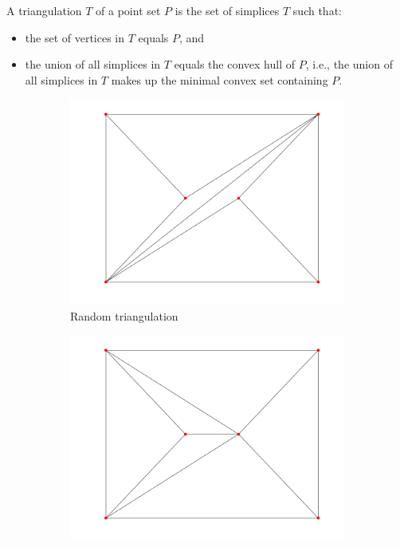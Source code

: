 \begin{definition}[Triangulation]
A triangulation $T$ of a point set $P$ is the set of simplices $T$ such that:
\begin{itemize}
    \item the set of vertices in $T$ equals $P$, and
    \item the union of all simplices in $T$ equals the convex hull of $P$, i.e., the union of all simplices in $T$ makes up the minimal convex set containing $P$.
\end{itemize}
\end{definition}
\begin{figure}[ht]
    \centering
    \begin{subfigure}[b]{0.4\textwidth}
        \centering
        \includegraphics[width=\textwidth]{report/Images/Theory/triangulation/triangulation_random.png}
        \caption{Random triangulation}
        \label{fig:triangulation-random}
    \end{subfigure}
    \begin{subfigure}[b]{0.4\textwidth}
        \centering
        \includegraphics[width=\textwidth]{report/Images/Theory/triangulation/triangulation_delaunay.png}

\end{subfigure}
\end{figure}
